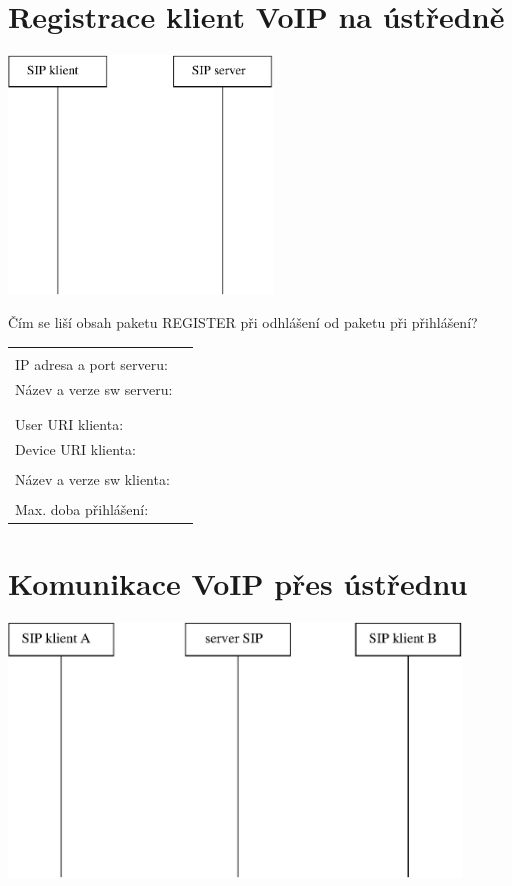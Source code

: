 \section{Registrace klient VoIP na ústředně}
\begin{multicols}{2}
  \begin{center}
    \includegraphics[width=70mm]{registrace.eps}
  \end{center}
    Čím se liší obsah paketu REGISTER při odhlášení od paketu při přihlášení?
  \columnbreak
  
  \begin{tabular}{lp{2cm}}
    &\\
    IP adresa a port serveru: &\\
    Název a verze sw serveru: &\\
    &\\
    &\\
    User URI klienta: &\\
    Device URI klienta: &\\
    &\\
    Název a verze sw klienta: &\\
    &\\
    Max. doba přihlášení: &\\
  \end{tabular}               
\end{multicols}

\section{Komunikace VoIP přes ústřednu}
  \begin{center}    
    \includegraphics[width=120mm]{pres-ustrednu.eps}
  \end{center}

